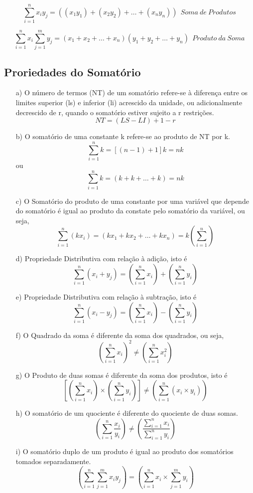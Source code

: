 $$ \sum_{i=1}^{n}x_{i}y_{j}= \left( (x_{1}y_{1})+(x_{2}y_{2})+\ldots+(x_{n}y_{n}) \right) \ \ Soma \ de \ Produtos$$

$$ \sum_{i=1}^{n}x_{i} \sum_{j=1}^{m}y_{j}= (x_{1}+x_{2}+\ldots+x_{n})(y_{1}+y_{2}+\ldots+y_{n}) \ \ Produto \ da \ Soma$$


\subsection{Proriedades do Somatório}

\begin{enumerate}
  \item [{a})] O número de termos (NT) de um somatório refere-se à diferença entre os limites superior (ls) e inferior (li) acrescido da unidade, ou adicionalmente decrescido de r, quando o somatório estiver sujeito a r restrições.
\begin{equation}\label{}
    NT=(LS-LI)+1-r
\end{equation}
  \item [{b})] O somatório de uma constante k refere-se ao produto de NT por k.
$$\sum_{i=1}^{n}k=[(n-1)+1]k = nk $$
ou
$$ \sum_{i=1}^{n}k = (k+k+\ldots+k) = nk $$
  \item [{c})] O Somatório do produto de uma constante por uma variável que depende do somatório é igual ao produto da constate pelo somatório da variável, ou seja,
$$ \sum_{i=1}^{n}(kx_{i}) = (kx_{1}+kx_{2}+\ldots+kx_{n}) = k \left( \sum_{i=1}^{n} \right)$$
      \item [{d})] Propriedade Distributiva com relação à adição, isto é
$$ \sum_{i=1}^{n}(x_{i}+y_{j}) = \left( \sum_{i=1}^{n}x_{i} \right) + \left( \sum_{i=1}^{n}y_{i} \right) $$
  \item [{e})] Propriedade Distributiva com relação à subtração, isto é
$$ \sum_{i=1}^{n}(x_{i}-y_{j}) = \left( \sum_{i=1}^{n}x_{i}\right) - \left( \sum_{i=1}^{n}y_{i}  \right) $$
  \item [{f})] O Quadrado da soma é diferente da soma dos quadrados, ou seja,
  $$\left(\sum_{i=1}^{n}x_{i}\right)^{2} \neq  \left( \sum_{i=1}^{n}x_{i}^{2} \right)$$
  \item [{g})] O Produto de duas somas é diferente da soma dos produtos, isto é
  $$ \left[ \left(\sum_{i=1}^{n}x_{i} \right) \times \left(\sum_{i=1}^{n}y_{i} \right) \right] \neq  \left( \sum_{i=1}^{n} (x_{i} \times y_{i})\right) $$
  \item [{h})] O somatório de um quociente é diferente do quociente de duas somas.
$$  \left( \sum_{i=1}^{n} \frac{x_{i}}{y_{i}} \right) \neq \left( \frac{\sum_{i=1}^{n}x_{i}}{\sum_{i=1}^{n}y_{i}} \right) $$
  \item [{i})] O somatório duplo de um produto é igual ao produto dos somatórios tomados separadamente.
  $$   \left( \sum_{i=1}^{n} \sum_{j=1}^{m}x_{i}y_{j} \right)  =  \left( \sum_{i=1}^{n}x_{i} \times \sum_{j=1}^{m}y_{i} \right) $$
\end{enumerate}




